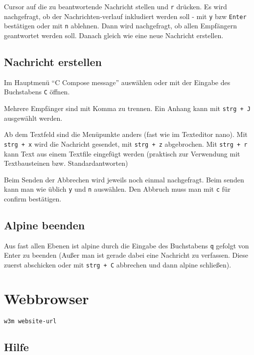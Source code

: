 \documentclass[]{book}
\begin{document}
Cursor auf die zu beantwortende Nachricht stellen und \texttt{r} drücken. Es wird nachgefragt, ob der Nachrichten-verlauf inkludiert werden soll - mit \texttt{y} bzw \texttt{Enter} bestätigen oder mit \texttt{n} ablehnen.
Dann wird nachgefragt, ob allen Empfängern geantwortet werden soll.
Danach gleich wie eine neue Nachricht erstellen.

\hypertarget{nachricht-erstellen}{%
\section{Nachricht erstellen}\label{nachricht-erstellen}}

Im Hauptmenü ``C Compose message'' auswählen oder mit der Eingabe des Buchstabens \texttt{C} öffnen.

Mehrere Empfänger sind mit Komma zu trennen.
Ein Anhang kann mit \texttt{strg\ +\ J} ausgewählt werden.

Ab dem Textfeld sind die Menüpunkte anders (fast wie im Texteditor nano). Mit \texttt{strg\ +\ x} wird die Nachricht gesendet, mit \texttt{strg\ +\ z} abgebrochen. Mit \texttt{strg\ +\ r} kann Text aus einem Textfile eingefügt werden (praktisch zur Verwendung mit Textbausteinen bzw. Standardantworten)

Beim Senden der Abbrechen wird jeweils noch einmal nachgefragt. Beim senden kann man wie üblich \texttt{y} und \texttt{n} auswählen. Den Abbruch muss man mit \texttt{c} für confirm bestätigen.

\hypertarget{alpine-beenden}{%
\section{Alpine beenden}\label{alpine-beenden}}

Aus fast allen Ebenen ist alpine durch die Eingabe des Buchstabens \texttt{q} gefolgt von Enter zu beenden (Außer man ist gerade dabei eine Nachricht zu verfassen. Diese zuerst abschicken oder mit \texttt{strg\ +\ C} abbrechen und dann alpine schließen).

\hypertarget{webbrowser}{%
\chapter{Webbrowser}\label{webbrowser}}

\begin{verbatim}
w3m website-url
\end{verbatim}

\hypertarget{hilfe-1}{%
\section{Hilfe}\label{hilfe-1}}
\end{document}
